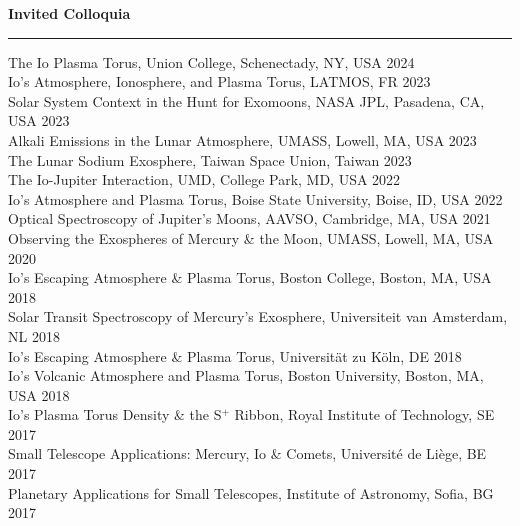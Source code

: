 \documentclass[12pt]{report}
\begin{document}
\vspace{2 mm}
\noindent\bf{Invited Colloquia}\rm \hspace*{\fill} \\
\rule{\textwidth}{1pt}
\noindent The Io Plasma Torus, Union College, Schenectady, NY, USA \hfill 2024\\
\noindent Io's Atmosphere, Ionosphere, and Plasma Torus, LATMOS, FR \hfill 2023\\
\noindent Solar System Context in the Hunt for Exomoons, NASA JPL, Pasadena, CA, USA \hfill 2023\\
\noindent Alkali Emissions in the Lunar Atmosphere, UMASS, Lowell, MA, USA \hfill 2023\\
\noindent The Lunar Sodium Exosphere, Taiwan Space Union, Taiwan \hfill 2023\\
\noindent The Io-Jupiter Interaction, UMD, College Park, MD, USA \hfill 2022\\
\noindent Io's Atmosphere and Plasma Torus, Boise State University, Boise, ID, USA \hfill 2022\\
\noindent Optical Spectroscopy of Jupiter's Moons, AAVSO, Cambridge, MA, USA \hfill 2021\\
\noindent Observing the Exospheres of Mercury \& the Moon, UMASS, Lowell, MA, USA \hfill 2020\\
\noindent Io's Escaping Atmosphere \& Plasma Torus, Boston College, Boston, MA, USA \hfill 2018\\
\noindent Solar Transit Spectroscopy of Mercury's Exosphere, Universiteit van Amsterdam, NL \hfill 2018\\
\noindent Io's Escaping Atmosphere \& Plasma Torus, Universit\"at zu K\"oln, DE \hfill 2018\\
\noindent Io's Volcanic Atmosphere and Plasma Torus, Boston University, Boston, MA, USA \hfill 2018\\
\noindent Io's Plasma Torus Density \& the S$^+$ Ribbon, Royal Institute of Technology, SE \hfill 2017\\
\noindent Small Telescope Applications: Mercury, Io \& Comets, Universit\'e de Li\`ege, BE \hfill 2017\\
\noindent Planetary Applications for Small Telescopes, Institute of Astronomy, Sofia, BG \hfill 2017\\
\end{document}
